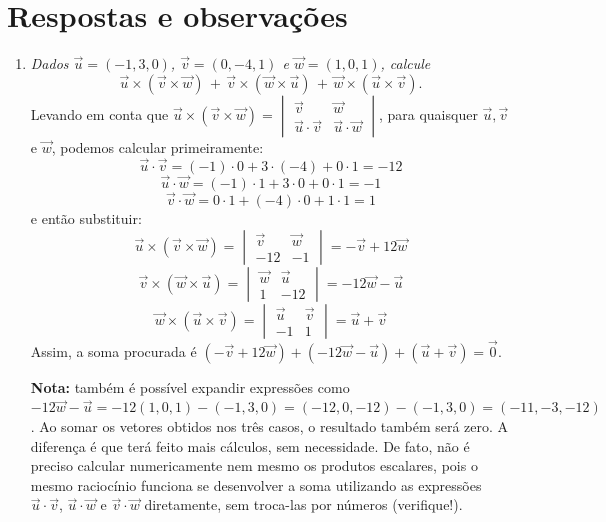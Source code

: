 \documentclass[12pt,a4paper]{article}
\begin{document}
\newpage
\restoregeometry
\section*{Respostas e observações}

\begin{enumerate}
\item \textit{Dados $\vec{u}=(-1,3,0)$, $\vec{v}=(0,-4,1)$ e $\vec{w}=(1,0,1)$, calcule
\[
  \vec{u} \times (\vec{v} \times \vec{w}) \, + \,
  \vec{v} \times (\vec{w} \times \vec{u}) \, + \,
  \vec{w} \times (\vec{u} \times \vec{v}).
\]
}
Levando em conta que $\vec{u} \times (\vec{v} \times \vec{w})
= \begin{vmatrix}
\vec{v} & \vec{w} \\
\vec{u} \cdot \vec{v} & \vec{u} \cdot \vec{w}
\end{vmatrix}$, para quaisquer $\vec{u}, \vec{v}$ e $\vec{w}$, podemos calcular primeiramente:
\[
\vec{u} \cdot \vec{v} = (-1) \cdot 0 + 3 \cdot (-4) + 0 \cdot 1 = -12
\]
\[
\vec{u} \cdot \vec{w} = (-1) \cdot 1 + 3 \cdot 0 + 0 \cdot 1 = -1
\]
\[
\vec{v} \cdot \vec{w} = 0 \cdot 1 + (-4) \cdot 0 + 1 \cdot 1 = 1
\]
e então substituir:
\[
\vec{u} \times (\vec{v} \times \vec{w})
= \begin{vmatrix}
\vec{v} & \vec{w} \\
-12 & -1
\end{vmatrix}
= -\vec{v} +12 \vec{w}
\]
\[
\vec{v} \times (\vec{w} \times \vec{u})
= \begin{vmatrix}
\vec{w} & \vec{u} \\
1 & -12
\end{vmatrix}
= -12\vec{w} - \vec{u}
\]
\[
\vec{w} \times (\vec{u} \times \vec{v})
= \begin{vmatrix}
\vec{u} & \vec{v} \\
-1 & 1
\end{vmatrix}
= \vec{u} + \vec{v}
\]
Assim, a soma procurada é $(-\vec{v} + 12 \vec{w}) + (-12\vec{w} - \vec{u}) + (\vec{u} + \vec{v}) = \vec{0}$.

\textbf{Nota:} também é possível expandir expressões como $-12\vec{w} - \vec{u} = -12(1,0,1) - (-1,3,0) = (-12,0,-12) - (-1,3,0) = (-11,-3,-12)$. Ao somar os vetores obtidos nos três casos, o resultado também será zero. A diferença é que terá feito mais cálculos, sem necessidade. De fato, não é preciso calcular numericamente nem mesmo os produtos escalares, pois o mesmo raciocínio funciona se desenvolver a soma utilizando as expressões $\vec{u} \cdot \vec{v}$, $\vec{u} \cdot \vec{w}$ e $\vec{v} \cdot \vec{w}$ diretamente, sem troca-las por números (verifique!).



\end{enumerate}
\end{document}
